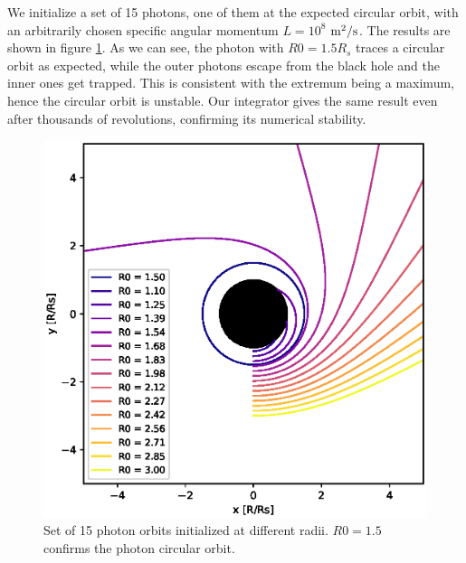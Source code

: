 \documentclass[journal, a4paper]{IEEEtran}
\begin{document}
We initialize a set of 15 photons, one of them at the expected circular orbit, with an arbitrarily chosen specific angular momentum $L=10^8$ $\si[per-mode=symbol]{\meter^2\per \second}$. The results are shown in figure \ref{fig::photon_geodesics}. As we can see, the photon with $R0=1.5R_s$ traces a circular orbit as expected, while the outer photons escape from the black hole and the inner ones get trapped. This is consistent with the extremum being a maximum, hence the circular orbit is unstable. Our integrator gives the same result even after thousands of revolutions, confirming its numerical stability. 
\begin{figure}[!hbt]
	\begin{center}
	\includegraphics[width=\columnwidth]{photon_geodesics.eps}
	\caption{Set of 15 photon orbits initialized at different radii. $R0=1.5$ confirms the photon circular orbit.}
	\label{fig::photon_geodesics}
\end{center}
\end{figure}
\end{document}
